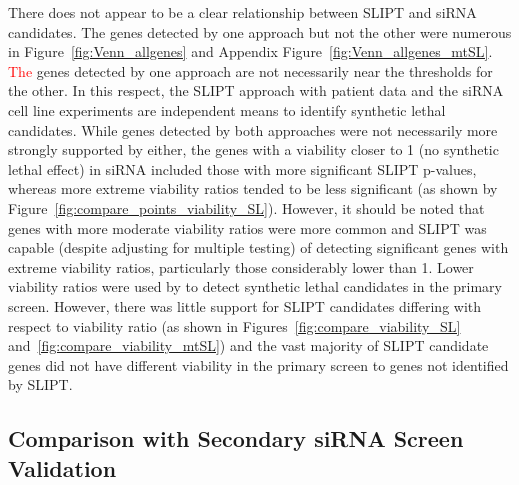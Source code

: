 There does not appear to be a clear relationship between \gls{SLIPT} and \gls{siRNA} candidates. The genes detected by one approach but not the other were numerous in Figure~\ref{fig:Venn_allgenes} and Appendix Figure~\ref{fig:Venn_allgenes_mtSL}. \textcolor{red}{The} genes detected by one approach are not necessarily near the thresholds for the other. In this respect, the \gls{SLIPT} approach with patient data and the \gls{siRNA} cell line experiments are independent means to identify \gls{synthetic lethal} candidates. While genes detected by both approaches were not necessarily more strongly supported by either, the genes with a viability closer to 1 (no \gls{synthetic lethal} effect) in \gls{siRNA} included those with more significant \gls{SLIPT} p-values, whereas more extreme viability ratios tended to be less significant (as shown by Figure~\ref{fig:compare_points_viability_SL}). However, it should be noted that genes with more moderate viability ratios were more common and \gls{SLIPT} was capable (despite adjusting for multiple testing) of detecting significant genes with extreme viability ratios, particularly those considerably lower than 1. 
%
Lower viability ratios were used by \citet{Telford2015} to detect \gls{synthetic lethal} candidates in the primary screen. However, there was little support for \gls{SLIPT} candidates differing with respect to viability ratio (as shown in Figures~\ref{fig:compare_viability_SL} and~\ref{fig:compare_viability_mtSL}) %
and the vast majority of \gls{SLIPT} candidate genes did not have different viability in the primary screen to genes not identified by \gls{SLIPT}.


\FloatBarrier

\subsection{Comparison with Secondary siRNA Screen Validation} 
\label{chapt3:secondary_screen}

